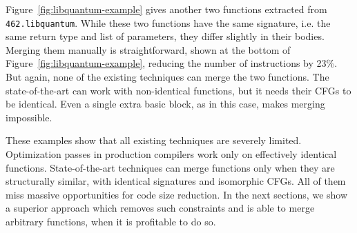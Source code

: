 Figure~\ref{fig:libquantum-example} gives another two functions extracted from \texttt{462.libquantum}. While these two functions have the
same signature, i.e. the same return type and list of parameters, they differ slightly in their bodies. Merging them manually
is straightforward, shown at the bottom of Figure~\ref{fig:libquantum-example}, reducing the number of instructions by 23\%. But again,
none of the existing techniques can merge the two functions. The state-of-the-art can work with non-identical functions, but it needs
their CFGs to be identical. Even a single extra basic block, as in this case, makes merging impossible.

These examples show that all existing techniques are severely limited.
Optimization passes in production compilers work only on effectively identical
functions. State-of-the-art techniques can merge functions only when they are
structurally similar, with identical signatures and isomorphic CFGs. All of
them miss massive opportunities for code size reduction. In the next sections,
we show a superior approach which removes such constraints and is able to merge
arbitrary functions, when it is profitable to do so.
